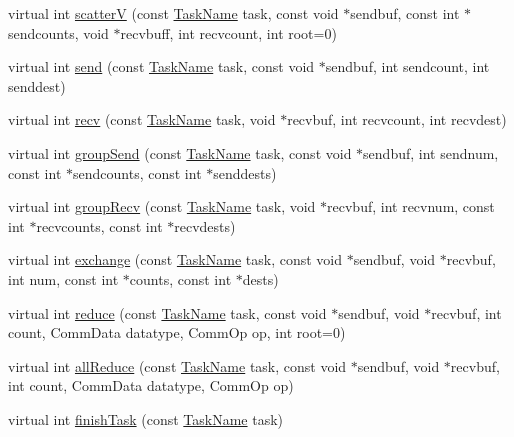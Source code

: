 \begin{DoxyCompactItemize}
virtual int \hyperlink{classHSF_1_1Communicator_ad9f7ec0244f1400f0ab12da93d4d7692}{scatterV} (const \hyperlink{namespaceHSF_a928eb958edfcd09f62de19e9cd3bac70}{TaskName} task, const void $\ast$sendbuf, const int $\ast$sendcounts, void $\ast$recvbuff, int recvcount, int root=0)
\item 
virtual int \hyperlink{classHSF_1_1Communicator_a29a10dcfc67e9256334db3afd37b8110}{send} (const \hyperlink{namespaceHSF_a928eb958edfcd09f62de19e9cd3bac70}{TaskName} task, const void $\ast$sendbuf, int sendcount, int senddest)
\item 
virtual int \hyperlink{classHSF_1_1Communicator_a5eef2313efb2d5ef60a8cad80262c16a}{recv} (const \hyperlink{namespaceHSF_a928eb958edfcd09f62de19e9cd3bac70}{TaskName} task, void $\ast$recvbuf, int recvcount, int recvdest)
\item 
virtual int \hyperlink{classHSF_1_1Communicator_ade12846093265c30681b1c8e79766ce2}{groupSend} (const \hyperlink{namespaceHSF_a928eb958edfcd09f62de19e9cd3bac70}{TaskName} task, const void $\ast$sendbuf, int sendnum, const int $\ast$sendcounts, const int $\ast$senddests)
\item 
virtual int \hyperlink{classHSF_1_1Communicator_a6735f3712db25e66402f1f6ea95e51ac}{groupRecv} (const \hyperlink{namespaceHSF_a928eb958edfcd09f62de19e9cd3bac70}{TaskName} task, void $\ast$recvbuf, int recvnum, const int $\ast$recvcounts, const int $\ast$recvdests)
\item 
virtual int \hyperlink{classHSF_1_1Communicator_a9459ed3c5350a046e5ab91ae329e650b}{exchange} (const \hyperlink{namespaceHSF_a928eb958edfcd09f62de19e9cd3bac70}{TaskName} task, const void $\ast$sendbuf, void $\ast$recvbuf, int num, const int $\ast$counts, const int $\ast$dests)
\item 
virtual int \hyperlink{classHSF_1_1Communicator_a17438ea5cd35f2ae41f48a2abfa1838f}{reduce} (const \hyperlink{namespaceHSF_a928eb958edfcd09f62de19e9cd3bac70}{TaskName} task, const void $\ast$sendbuf, void $\ast$recvbuf, int count, CommData datatype, CommOp op, int root=0)
\item 
virtual int \hyperlink{classHSF_1_1Communicator_aa89f31910f7d7f51549ef73acde75236}{allReduce} (const \hyperlink{namespaceHSF_a928eb958edfcd09f62de19e9cd3bac70}{TaskName} task, const void $\ast$sendbuf, void $\ast$recvbuf, int count, CommData datatype, CommOp op)
\item 
virtual int \hyperlink{classHSF_1_1Communicator_afd2efabdf9dc5461641311337c36b12f}{finishTask} (const \hyperlink{namespaceHSF_a928eb958edfcd09f62de19e9cd3bac70}{TaskName} task)

\end{DoxyCompactItemize}
